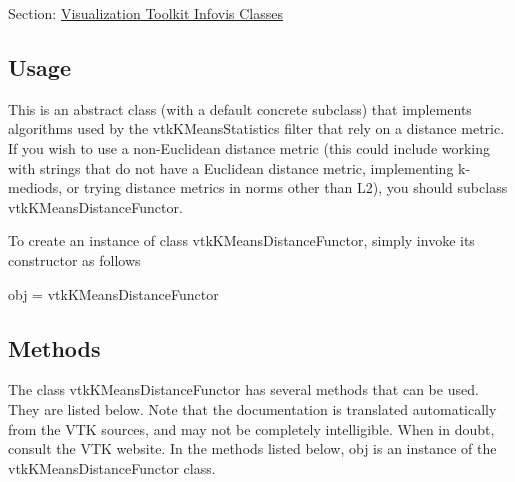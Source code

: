 Section\-: \hyperlink{sec_vtkinfovis}{Visualization Toolkit Infovis Classes} \hypertarget{vtkwidgets_vtkxyplotwidget_Usage}{}\subsection{Usage}\label{vtkwidgets_vtkxyplotwidget_Usage}
This is an abstract class (with a default concrete subclass) that implements algorithms used by the vtk\-K\-Means\-Statistics filter that rely on a distance metric. If you wish to use a non-\/\-Euclidean distance metric (this could include working with strings that do not have a Euclidean distance metric, implementing k-\/mediods, or trying distance metrics in norms other than L2), you should subclass vtk\-K\-Means\-Distance\-Functor.

To create an instance of class vtk\-K\-Means\-Distance\-Functor, simply invoke its constructor as follows \begin{DoxyVerb}  obj = vtkKMeansDistanceFunctor
\end{DoxyVerb}
 \hypertarget{vtkwidgets_vtkxyplotwidget_Methods}{}\subsection{Methods}\label{vtkwidgets_vtkxyplotwidget_Methods}
The class vtk\-K\-Means\-Distance\-Functor has several methods that can be used. They are listed below. Note that the documentation is translated automatically from the V\-T\-K sources, and may not be completely intelligible. When in doubt, consult the V\-T\-K website. In the methods listed below, {\ttfamily obj} is an instance of the vtk\-K\-Means\-Distance\-Functor class. 
